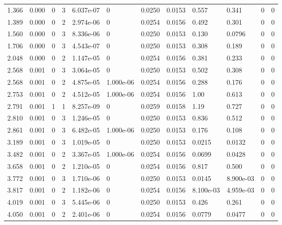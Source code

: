 \documentclass[preview]{standalone}
\begin{document}
{{\begin{tabular}{L{1.2cm}C{1.2cm} C{0.3cm}C{0.5cm} C{1.4cm}C{1.4cm} C{1.4cm}C{1.4cm} C{1.6cm}C{1.6cm} C{1.6cm}C{1.6cm}}
  1.366  &  0.000  & 0     &  3 &  6.037e-07  & 0  &  0.0250&   0.0153& 0.557 & 0.341   &  0 & 0  \\ 
  1.389  &  0.000  & 0     &  2 &  2.974e-06  & 0  &  0.0254&   0.0156& 0.492 & 0.301   &  0 & 0  \\ 
  1.560  &  0.000  & 0     &  3 &  8.336e-06  & 0  &  0.0250&   0.0153& 0.130 & 0.0796   &  0 & 0  \\ 
  1.706  &  0.000  & 0     &  3 &  4.543e-07  & 0  &  0.0250&   0.0153& 0.308 & 0.189   &  0 & 0  \\ 
  2.048  &  0.000  & 0     &  2 &  1.147e-05  & 0  &  0.0254&   0.0156& 0.381 & 0.233   &  0 & 0  \\ 
  2.568  &  0.001  & 0     &  3 &  3.064e-05  & 0  &  0.0250&   0.0153& 0.502 & 0.308   &  0 & 0  \\ 
  2.568  &  0.001  & 0     &  2 &  4.875e-05  & 1.000e-06  &  0.0254&   0.0156& 0.288 & 0.176   &  0 & 0  \\ 
  2.753  &  0.001  & 0     &  2 &  4.512e-05  & 1.000e-06  &  0.0254&   0.0156& 1.00 & 0.613   &  0 & 0  \\ 
  2.791  &  0.001  & 1     &  1 &  8.257e-09  & 0  &  0.0259&   0.0158& 1.19 & 0.727   &  0 & 0  \\ 
  2.810  &  0.001  & 0     &  3 &  1.246e-05  & 0  &  0.0250&   0.0153& 0.836 & 0.512   &  0 & 0  \\ 
  2.861  &  0.001  & 0     &  3 &  6.482e-05  & 1.000e-06  &  0.0250&   0.0153& 0.176 & 0.108   &  0 & 0  \\ 
  3.189  &  0.001  & 0     &  3 &  1.019e-05  & 0  &  0.0250&   0.0153& 0.0215 & 0.0132   &  0 & 0  \\ 
  3.482  &  0.001  & 0     &  2 &  3.367e-05  & 1.000e-06  &  0.0254&   0.0156& 0.0699 & 0.0428   &  0 & 0  \\ 
  3.658  &  0.001  & 0     &  2 &  1.210e-05  & 0  &  0.0254&   0.0156& 0.817 & 0.500   &  0 & 0  \\ 
  3.772  &  0.001  & 0     &  3 &  1.710e-06  & 0  &  0.0250&   0.0153& 0.0145 & 8.900e-03   &  0 & 0  \\ 
  3.817  &  0.001  & 0     &  2 &  1.182e-06  & 0  &  0.0254&   0.0156& 8.100e-03 & 4.959e-03   &  0 & 0  \\ 
  4.019  &  0.001  & 0     &  3 &  5.445e-06  & 0  &  0.0250&   0.0153& 0.426 & 0.261   &  0 & 0  \\ 
  4.050  &  0.001  & 0     &  2 &  2.401e-06  & 0  &  0.0254&   0.0156& 0.0779 & 0.0477   &  0 & 0  \\ 

\end{tabular}}}
\end{document}
